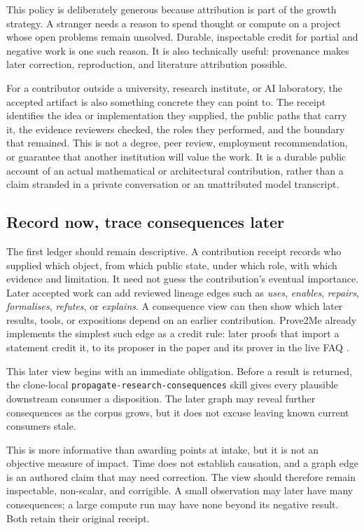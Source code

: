 \documentclass[10pt]{article}
\begin{document}
This policy is deliberately generous because attribution is part of the
growth strategy.  A stranger needs a reason to spend thought or compute on a
project whose open problems remain unsolved.  Durable, inspectable credit for
partial and negative work is one such reason.  It is also technically useful:
provenance makes later correction, reproduction, and literature attribution
possible.

For a contributor outside a university, research institute, or AI laboratory,
the accepted artifact is also something concrete they can point to.  The
receipt identifies the idea or implementation they supplied, the public paths
that carry it, the evidence reviewers checked, the roles they performed, and
the boundary that remained.  This is not a degree, peer review, employment
recommendation, or guarantee that another institution will value the work.
It is a durable public account of an actual mathematical or architectural
contribution, rather than a claim stranded in a private conversation or an
unattributed model transcript.

\subsection*{Record now, trace consequences later}

The first ledger should remain descriptive.  A contribution receipt records
who supplied which object, from which public state, under which role, with
which evidence and limitation.  It need not guess the contribution's eventual
importance.  Later accepted work can add reviewed lineage edges such as
\emph{uses}, \emph{enables}, \emph{repairs}, \emph{formalises}, \emph{refutes},
or \emph{explains}.  A consequence view can then show which later results,
tools, or expositions depend on an earlier contribution.  Prove2Me already
implements the simplest such edge as a credit rule: later proofs that import a
statement credit it, to its proposer in the paper and its prover in the live
FAQ \cite{prove2me}.

This later view begins with an immediate obligation. Before a result is
returned, the clone-local \texttt{propagate-research-consequences} skill gives
every plausible downstream consumer a disposition. The later graph may reveal
further consequences as the corpus grows, but it does not excuse leaving known
current consumers stale.

This is more informative than awarding points at intake, but it is not an
objective measure of impact.  Time does not establish causation, and a graph
edge is an authored claim that may need correction.  The view should therefore
remain inspectable, non-scalar, and corrigible.  A small observation may later
have many consequences; a large compute run may have none beyond its negative
result.  Both retain their original receipt.
\end{document}
